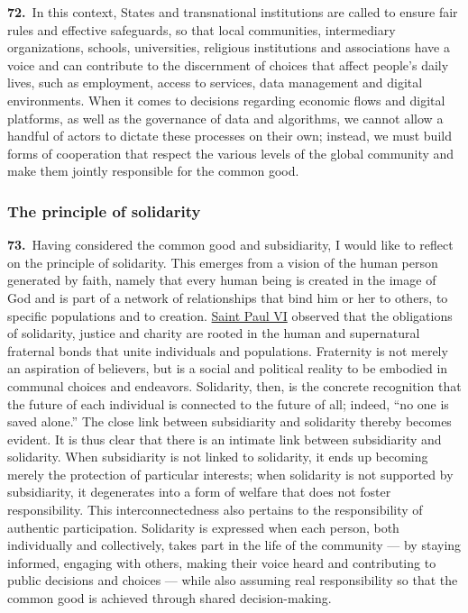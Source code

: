 \documentclass{article}
\begin{document}
\textbf{72.}\ In this context, States and transnational institutions are called to ensure fair rules and effective safeguards, so that local communities, intermediary organizations, schools, universities, religious institutions and associations have a voice and can contribute to the discernment of choices that affect people's daily lives, such as employment, access to services, data management and digital environments. When it comes to decisions regarding economic flows and digital platforms, as well as the governance of data and algorithms, we cannot allow a handful of actors to dictate these processes on their own; instead, we must build forms of cooperation that respect the various levels of the global community and make them jointly responsible for the common good.\cite{n97}

\subsubsection{The principle of solidarity}

\textbf{73.}\ Having considered the common good and subsidiarity, I would like to reflect on the principle of solidarity. This emerges from a vision of the human person generated by faith, namely that every human being is created in the image of God and is part of a network of relationships that bind him or her to others, to specific populations and to creation. \href{https://www.vatican.va/content/paul-vi/en.html}{Saint Paul VI} observed that the obligations of solidarity, justice and charity are rooted in the human and supernatural fraternal bonds that unite individuals and populations.\cite{n98} Fraternity is not merely an aspiration of believers, but is a social and political reality to be embodied in communal choices and endeavors. Solidarity, then, is the concrete recognition that the future of each individual is connected to the future of all; indeed, ``no one is saved alone.''\cite{n99} The close link between subsidiarity and solidarity thereby becomes evident. It is thus clear that there is an intimate link between subsidiarity and solidarity. When subsidiarity is not linked to solidarity, it ends up becoming merely the protection of particular interests; when solidarity is not supported by subsidiarity, it degenerates into a form of welfare that does not foster responsibility.\cite{n100} This interconnectedness also pertains to the responsibility of authentic participation. Solidarity is expressed when each person, both individually and collectively, takes part in the life of the community --- by staying informed, engaging with others, making their voice heard and contributing to public decisions and choices --- while also assuming real responsibility so that the common good is achieved through shared decision-making.
\end{document}
